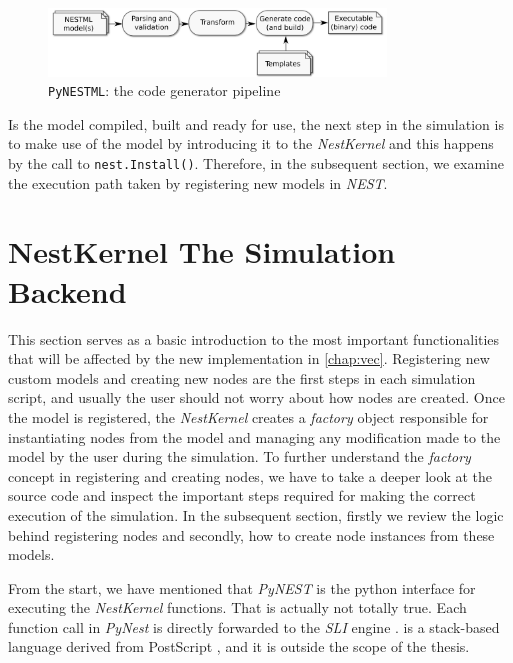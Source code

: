 \begin{figure}[h!]
\centering
\includegraphics[width=0.8\textwidth]{src/pic/internal_workflow.png}
\caption{\texttt{PyNESTML}: the code generator pipeline}
\label{fig:pynestml_workflow}
\end{figure}



Is the model compiled, built and ready for use, the next step in the simulation is to make use of the model by introducing it to the \emph{NestKernel} and this happens by the call to \texttt{nest.Install()}. Therefore, in the subsequent section, we examine the execution path taken by registering new models in \emph{NEST}.

\section{NestKernel The Simulation Backend}


This section serves as a basic introduction to the most important functionalities that will be affected by the new implementation in \autoref{chap:vec}. Registering new custom models and creating new nodes are the first steps in each simulation script, and usually the user should not worry about how nodes are created. Once the model is registered, the \emph{NestKernel} creates a \emph{factory} object responsible for instantiating nodes from the model and managing any modification made to the model by the user during the simulation. To further understand the \emph{factory} concept in registering and creating nodes, we have to take a deeper look at the source code and inspect the important steps required for making the correct execution of the simulation. In the subsequent section, firstly we review the logic behind registering nodes and secondly, how to create node instances from these models.

From the start, we have mentioned that \emph{PyNEST} is the python interface for executing the \emph{NestKernel} functions. That is actually not totally true. Each function call in \emph{PyNest} is directly forwarded to the \emph{SLI} engine \cite{gewaltig2007nest}.  is a stack-based language derived from PostScript \cite{adobe1990postscript}, and it is outside the scope of the thesis.

